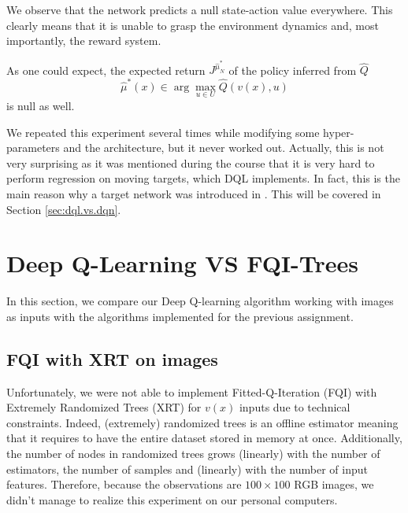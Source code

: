 \documentclass[a4paper, 12pt]{article}
\begin{document}
    We observe that the network predicts a null state-action value everywhere. This clearly means that it is unable to grasp the environment dynamics and, most importantly, the reward system.
    
    As one could expect, the expected return\footnotemark{} $J^{\hat{\mu}^*_N}$ of the policy inferred from $\hat{Q}$ 
    \begin{equation}\label{eq:mu.derived}
        \hat{\mu}^*(x) \in \arg\max_{u \in U} \hat{Q}(v(x), u)
    \end{equation}
    is null as well.
    
    
    We repeated this experiment several times while modifying some hyper-parameters and the architecture, but it never worked out. Actually, this is not very surprising as it was mentioned during the course \cite{ernstinfo8003qfunctions} that it is very hard to perform regression on moving targets, which DQL implements. In fact, this is the main reason why a target network was introduced in \textcite{mnih2015human}. This will be covered in Section \ref{sec:dql.vs.dqn}.
    
    \section{Deep Q-Learning VS FQI-Trees}
    
    In this section, we compare our Deep Q-learning algorithm working with images as inputs with the algorithms implemented for the previous assignment.
    
    \subsection{FQI with XRT on images}
    
    Unfortunately, we were not able to implement Fitted-Q-Iteration (FQI) with Extremely Randomized Trees (XRT) for $v(x)$ inputs due to technical constraints. Indeed, (extremely) randomized trees is an offline estimator meaning that it requires to have the entire dataset stored in memory at once. Additionally, the number of nodes in randomized trees grows (linearly) with the number of estimators, the number of samples and (linearly) with the number of input features. Therefore, because the observations are $100 \times 100$ RGB images, we didn't manage to realize this experiment on our personal computers.
    
\end{document}

